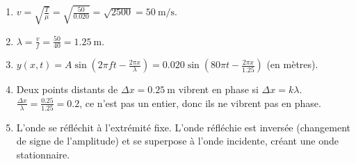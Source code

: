 \begin{enumerate}
    \item $v = \sqrt{\frac{T}{\mu}} = \sqrt{\frac{50}{0.020}} = \sqrt{2500} = \SI{50}{\metre\per\second}$.
    \item $\lambda = \frac{v}{f} = \frac{50}{40} = \SI{1.25}{\metre}$.
    \item $y(x,t) = A \sin\left(2\pi ft - \frac{2\pi x}{\lambda}\right) = 0.020 \sin\left(80\pi t - \frac{2\pi x}{1.25}\right)$ (en mètres).
    \item Deux points distants de $\Delta x = \SI{0.25}{\metre}$ vibrent en phase si $\Delta x = k\lambda$. $\frac{\Delta x}{\lambda} = \frac{0.25}{1.25} = 0.2$, ce n'est pas un entier, donc ils ne vibrent pas en phase.
    \item L'onde se réfléchit à l'extrémité fixe. L'onde réfléchie est inversée (changement de signe de l'amplitude) et se superpose à l'onde incidente, créant une onde stationnaire.
\end{enumerate}